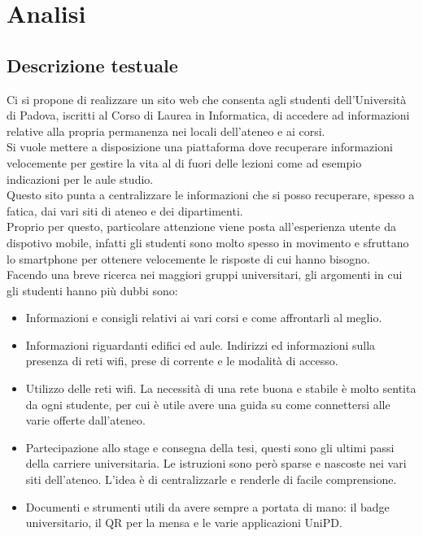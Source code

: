 \section{Analisi}
\subsection{Descrizione testuale}

Ci si propone di realizzare un sito web che consenta agli studenti dell'Università di Padova, iscritti al Corso di Laurea in Informatica, di accedere ad informazioni relative alla propria permanenza nei locali dell'ateneo e ai corsi.\\
Si vuole mettere a disposizione una piattaforma dove recuperare informazioni velocemente per gestire la vita al di fuori delle lezioni come ad esempio indicazioni per le aule studio.\\
Questo sito punta a centralizzare le informazioni che si posso recuperare, spesso a fatica, dai vari siti di ateneo e dei dipartimenti.\\
Proprio per questo, particolare attenzione viene posta all'esperienza utente da dispotivo mobile, infatti gli studenti sono molto spesso in movimento e sfruttano lo smartphone per ottenere velocemente le risposte di cui hanno bisogno.\\
Facendo una breve ricerca nei maggiori gruppi universitari, gli argomenti in cui gli studenti hanno più dubbi sono:
\begin{itemize}
    \item Informazioni e consigli relativi ai vari corsi e come affrontarli al meglio.
    \item Informazioni riguardanti edifici ed aule. Indirizzi ed informazioni sulla presenza di reti wifi, prese di corrente e le modalità di accesso.
    \item Utilizzo delle reti wifi. La necessità di una rete buona e stabile è molto sentita da ogni studente, per cui è utile avere una guida su come connettersi alle varie offerte dall'ateneo.   
    \item Partecipazione allo stage e consegna della tesi, questi sono gli ultimi passi della carriere universitaria. Le istruzioni sono però sparse e nascoste nei vari siti dell'ateneo. L'idea è di centralizzarle e renderle di facile comprensione.
    \item Documenti e strumenti utili da avere sempre a portata di mano: il badge universitario, il QR per la mensa e le varie applicazioni UniPD.
\end{itemize}

